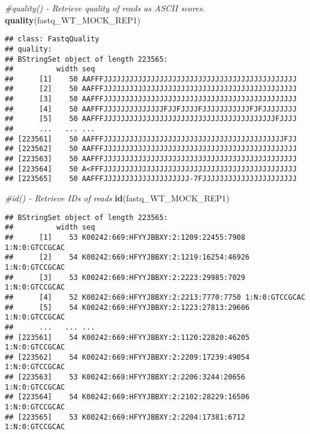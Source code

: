 \documentclass[
]{book}
\newenvironment{Shaded}{\begin{snugshade}}{\end{snugshade}}
\newcommand{\CommentTok}[1]{\textcolor[rgb]{0.56,0.35,0.01}{\textit{#1}}}
\newcommand{\FunctionTok}[1]{\textcolor[rgb]{0.13,0.29,0.53}{\textbf{#1}}}
\newcommand{\NormalTok}[1]{#1}
\begin{document}
\begin{Shaded}
\begin{Highlighting}[]
\CommentTok{\#quality() {-} Retrieve quality of reads as ASCII scores.}
\FunctionTok{quality}\NormalTok{(fastq\_WT\_MOCK\_REP1)}
\end{Highlighting}
\end{Shaded}

\begin{verbatim}
## class: FastqQuality
## quality:
## BStringSet object of length 223565:
##          width seq
##      [1]    50 AAFFFJJJJJJJJJJJJJJJJJJJJJJJJJJJJJJJJJJJJJJJJJJJJJ
##      [2]    50 AAFFFJJJJJJJJJJJJJJJJJJJJJJJJJJJJJJJJJJJJJJJJJJJJJ
##      [3]    50 AAFFFJJJJJJJJJJJJJJJJJJJJJJJJJJJJJJJJJJJJJJJJJJJJJ
##      [4]    50 AAFFFJJJJJJJJJJJJJJFJJFJJJJFJJJJJJJJJJJFJFJJJJJJJJ
##      [5]    50 AAFFFJJJJJJJJJJJJJJJJJJJJJJJJJJJJJJJJJJJJJJJJFJJJJ
##      ...   ... ...
## [223561]    50 AAFFFJJJJJJJJJJJJJJJJJJJJJJJJJJJJJJJJJJJJJJJJJJFJJ
## [223562]    50 AAFFFJJJJJJJJJJJJJJJJJJJJJJJJJJJJJJJJJJJJJJJJJJJJJ
## [223563]    50 AAFFFJJJJJJJJJJJJJJJJJJJJJJJJJJJJJJJJJJJJJJJJJJJJJ
## [223564]    50 A<FFFJJJJJJJJJJJJJJJJJJJJJJJJJJJJJJJJJJJJJJJJJJJJJ
## [223565]    50 AAFFFJJJJJJJJJJJJJJJJJJJJ-7FJJJJJJJJJJJJJJJJJJJJJJ
\end{verbatim}

\begin{Shaded}
\begin{Highlighting}[]
\CommentTok{\#id() {-} Retrieve IDs of reads}
\FunctionTok{id}\NormalTok{(fastq\_WT\_MOCK\_REP1)}
\end{Highlighting}
\end{Shaded}

\begin{verbatim}
## BStringSet object of length 223565:
##          width seq
##      [1]    53 K00242:669:HFYYJBBXY:2:1209:22455:7908 1:N:0:GTCCGCAC
##      [2]    54 K00242:669:HFYYJBBXY:2:1219:16254:46926 1:N:0:GTCCGCAC
##      [3]    53 K00242:669:HFYYJBBXY:2:2223:29985:7029 1:N:0:GTCCGCAC
##      [4]    52 K00242:669:HFYYJBBXY:2:2213:7770:7750 1:N:0:GTCCGCAC
##      [5]    54 K00242:669:HFYYJBBXY:2:1223:27813:29606 1:N:0:GTCCGCAC
##      ...   ... ...
## [223561]    54 K00242:669:HFYYJBBXY:2:1120:22820:46205 1:N:0:GTCCGCAC
## [223562]    54 K00242:669:HFYYJBBXY:2:2209:17239:49054 1:N:0:GTCCGCAC
## [223563]    53 K00242:669:HFYYJBBXY:2:2206:3244:20656 1:N:0:GTCCGCAC
## [223564]    54 K00242:669:HFYYJBBXY:2:2102:28229:16506 1:N:0:GTCCGCAC
## [223565]    53 K00242:669:HFYYJBBXY:2:2204:17381:6712 1:N:0:GTCCGCAC
\end{verbatim}
\end{document}
